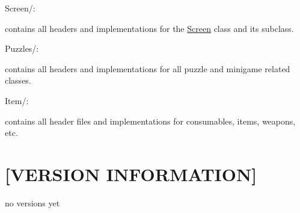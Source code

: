 Screen/\-:
\begin{DoxyItemize}
\item contains all headers and implementations for the \hyperlink{classScreen}{Screen} class and its subclass.
\end{DoxyItemize}

Puzzles/\-:
\begin{DoxyItemize}
\item contains all headers and implementations for all puzzle and minigame related classes.
\end{DoxyItemize}

Item/\-:
\begin{DoxyItemize}
\item contains all header files and implementations for consumables, items, weapons, etc.
\end{DoxyItemize}

\section*{\mbox{[}V\-E\-R\-S\-I\-O\-N I\-N\-F\-O\-R\-M\-A\-T\-I\-O\-N\mbox{]} }

no versions yet 